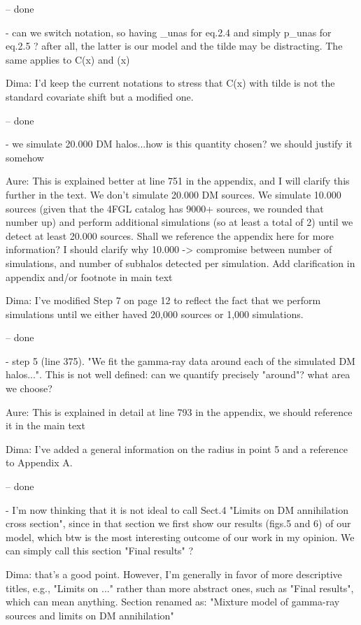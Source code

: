 -- done

- can we switch notation, so having _unas for eq.2.4 and simply p_unas for eq.2.5 ? after all, the latter is our model and the tilde may be distracting. The same applies to C(x) and (x)

Dima: I'd keep the current notations to stress that C(x) with tilde is not the standard covariate shift but a modified one.

-- done

-  we simulate 20.000 DM halos...how is this quantity chosen? we should justify it somehow

Aure: This is explained better at line 751 in the appendix, and I will clarify this further in the text. We don't simulate 20.000 DM sources. We simulate 10.000 sources (given that the 4FGL catalog has 9000+ sources, we rounded that number up) and perform additional simulations (so at least a total of 2) until we detect at least 20.000 sources. Shall we reference the appendix here for more information? 
I should clarify why 10.000 -> compromise between number of simulations, and number of subhalos detected per simulation. Add clarification in appendix and/or footnote in main text

Dima: I've modified Step 7 on page 12 to reflect the fact that we perform simulations until we either haved 20,000 sources or 1,000 simulations.

-- done

- step 5 (line 375). "We fit the gamma-ray data around each of the simulated DM halos...". This is not  well defined: can we quantify precisely "around"? what area we choose?

Aure: This is explained in detail  at line 793 in the appendix, we should reference it in the main text

Dima: I've added a general information on the radius in point 5 and a reference to Appendix A.

-- done

- I'm now thinking that it is not ideal to call Sect.4 "Limits on DM annihilation cross section", since in that section we first show our results (figs.5 and 6) of our model, which btw is the most interesting outcome of our work in my opinion. We can simply call this section "Final results" ?

Dima: that's a good point. However, I'm generally in favor of more descriptive titles, e.g., "Limits on ..." rather than more abstract ones, such as "Final results", which can mean anything. Section renamed as: "Mixture model of gamma-ray sources and limits on DM annihilation"

